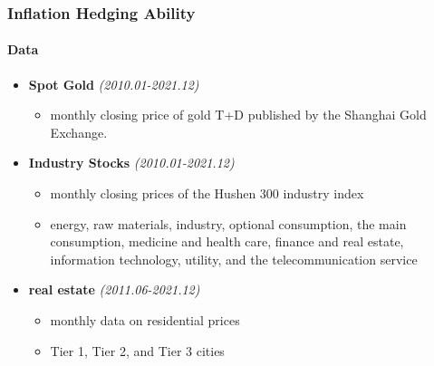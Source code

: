 \documentclass[
	11pt, %
]{beamer}
\begin{document}
\begin{frame}
\frametitle{Inflation Hedging Ability}
\framesubtitle{Data}
\begin{itemize}
\item \textbf{Spot Gold} \textit{(2010.01-2021.12)}
    \begin{itemize}
    \item monthly closing price of gold T+D published by the Shanghai Gold Exchange.\\
    \end{itemize}
\bigskip
\item \textbf{Industry Stocks} \textit{(2010.01-2021.12)}
    \begin{itemize}
    \item monthly closing prices of the Hushen 300 industry index\\
    \item energy, raw materials, industry, optional consumption, the main consumption, medicine and health care, finance and real estate, information technology, utility, and the telecommunication service\\
    \end{itemize}
\bigskip
\item \textbf{real estate} \textit{(2011.06-2021.12)}
    \begin{itemize}
    \item monthly data on residential prices\\
    \item Tier 1, Tier 2, and Tier 3 cities\\
    \end{itemize}
\end{itemize}
\end{frame}
\end{document}
